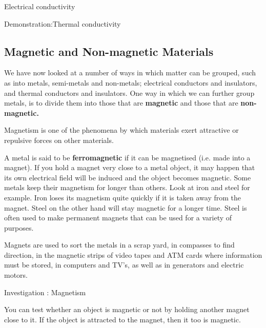 \begin{iexperiment}{Electrical conductivity}
\begin{gexperiment}{Demonstration:Thermal conductivity}
            \subsection{ Magnetic and Non-magnetic Materials}
            \nopagebreak
      \label{m38706*id67151}We have now looked at a number of ways in which matter can be grouped, such as into metals, semi-metals and non-metals; electrical conductors and insulators, and thermal conductors and insulators. One way in which we can further group metals, is to divide them into those that are \textbf{magnetic} and those that are \textbf{non-magnetic.}\par 
\par
\Definition{   \label{id2410309} { Magnetism }} { \label{m38706*meaningfhsst!!!underscore!!!id570}
      \label{m38706*id67174}Magnetism is one of the phenomena by which materials exert attractive or repulsive forces on other materials. \par 
       } 
      \label{m38706*id67186}A metal is said to be \textbf{ferromagnetic} if it can be magnetised (i.e. made into a magnet). If you hold a magnet very close to a metal object, it may happen that its own electrical field will be induced and the object becomes magnetic. Some metals keep their magnetism for longer than others. Look at iron and steel for example. Iron loses its magnetism quite quickly if it is taken away from the magnet. Steel on the other hand will stay magnetic for a longer time. Steel is often used to make permanent magnets that can be used for a variety of purposes.\par 
      \label{m38706*id67200}Magnets are used to sort the metals in a scrap yard, in compasses to find direction, in the magnetic strips of video tapes and ATM cards where information must be stored, in computers and TV's, as well as in generators and electric motors.\par 
\label{m38706*secfhsst!!!underscore!!!id575}
            \begin{gexperiment}{Investigation : Magnetism}{
            \nopagebreak
      \label{m38706*id67220}You can test whether an object is magnetic or not by holding another magnet close to it. If the object is attracted to the magnet, then it too is magnetic.\par 
}
\end{gexperiment}
\end{gexperiment}
\end{iexperiment}
